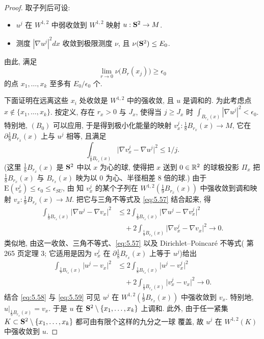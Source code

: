 \begin{proof}
取子列后可设:

\begin{itemize}[leftmargin=1.8em,itemsep=1pt,topsep=2pt]
\item $u^j$ 在 $W^{1,2}$ 中弱收敛到 $W^{1,2}$ 映射 $u:\mathbf{S}^2\to M$.
\item 测度 $|\nabla u^j|^2dx$ 收敛到极限测度 $\nu$, 且
      $\nu(\mathbf{S}^2)\leq E_0$.
\end{itemize}

由此, 满足
\begin{equation}
\lim_{r\to 0}\nu\bigl(B_r(x_j)\bigr)\geq\epsilon_0
\label{eq:5.56}
\end{equation}
的点 $x_1,\dots,x_k$ 至多有 $E_0/\epsilon_0$ 个.

下面证明在远离这些 $x_i$ 处收敛是 $W^{1,2}$ 中的强收敛, 且 $u$ 是调和的.
为此考虑点 $x\notin\{x_1,\dots,x_k\}$. 按定义, 存在 $r_x>0$ 与 $J_x$,
使得当 $j\geq J_x$ 时 $\int_{B_{r_x}(x)}|\nabla u^j|^2<\epsilon_0$. 特别地,
$(B_0)$ 可以应用, 于是得到极小化能量的映射
$v_x^j:\frac18B_{r_x}(x)\to M$, 它在
$\partial\frac18B_{r_x}(x)$ 上与 $u^j$ 相等, 且满足
\begin{equation}
\int_{\frac18B_{r_x}(x)}\bigl|\nabla v_x^j-\nabla u^j\bigr|^2\leq 1/j.
\label{eq:5.57}
\end{equation}
(这里 $\frac18B_{r_x}(x)$ 是 $\mathbf{S}^2$ 中以 $x$ 为心的球, 使得把 $x$ 送到
$0\in\mathbb{R}^2$ 的球极投影 $\Pi_x$ 把 $\frac18B_{r_x}(x)$ 与 $B_{r_x}(x)$
映为以 $0$ 为心、半径相差 $8$ 倍的球.) 由于
$\mathrm{E}(v_x^j)\leq\epsilon_0\leq\epsilon_{SU}$, 由 知
$v_x^j$ 的某个子列在 $W^{1,2}(\frac19B_{r_x}(x))$ 中强收敛到调和映射
$v_x:\frac19B_{r_x}(x)\to M$. 把它与三角不等式及 \eqref{eq:5.57}
结合起来, 得
\begin{equation}
\begin{aligned}
\int_{\frac19B_{r_x}(x)}\bigl|\nabla u^j-\nabla v_x\bigr|^2
&\leq 2\int_{\frac19B_{r_x}(x)}\bigl|\nabla u^j-\nabla v_x^j\bigr|^2\\
&\quad +2\int_{\frac19B_{r_x}(x)}\bigl|\nabla v_x^j-\nabla v_x\bigr|^2\to 0.
\end{aligned}
\label{eq:5.58}
\end{equation}
类似地, 由这一收敛、三角不等式、\eqref{eq:5.57} 以及 Dirichlet--Poincar\'e
不等式(\cite{Ev} 第 265 页定理 3; 它适用是因为 $v_x^j$ 在
$\partial\frac18B_{r_x}(x)$ 上等于 $u^j$)给出
\begin{equation}
\begin{aligned}
\int_{\frac19B_{r_x}(x)}\bigl|u^j-v_x\bigr|^2
&\leq 2\int_{\frac18B_{r_x}(x)}\bigl|u^j-v_x^j\bigr|^2\\
&\quad +2\int_{\frac19B_{r_x}(x)}\bigl|v_x^j-v_x\bigr|^2\to 0.
\end{aligned}
\label{eq:5.59}
\end{equation}
结合 \eqref{eq:5.58} 与 \eqref{eq:5.59} 可见 $u^j$ 在
$W^{1,2}(\frac19B_{r_x}(x))$ 中强收敛到 $v_x$. 特别地,
$u|_{\frac19B_{r_x}(x)}=v_x$. 于是 $u$ 在
$\mathbf{S}^2\setminus\{x_1,\dots,x_k\}$ 上调和. 此外, 由于任一紧集
$K\subset\mathbf{S}^2\setminus\{x_1,\dots,x_k\}$ 都可由有限个这样的九分之一球
覆盖, 故 $u^j$ 在 $W^{1,2}(K)$ 中强收敛到 $u$.


\end{proof}
